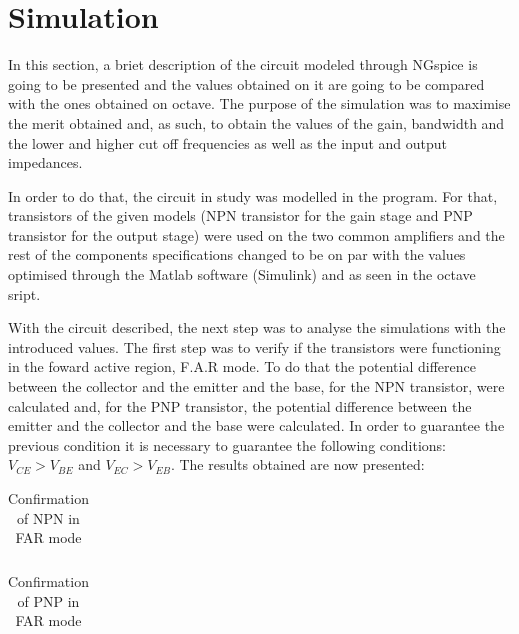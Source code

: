 \section{Simulation}
\label{sec:simulation}

\par In this section, a briet description of the circuit modeled through NGspice is going to be presented and the values obtained on it are going to be compared with the ones obtained on octave. The purpose of the simulation was to maximise the merit obtained and, as such, to obtain the values of the gain, bandwidth and the lower and higher  cut off frequencies as well as the input and output impedances.

\par In order to do that, the circuit in study was modelled in the program. For that, transistors of the given models (NPN transistor for the gain stage and PNP transistor for the output stage) were used on the two common amplifiers and the rest of the components specifications changed to be on par with the values optimised through the Matlab software (Simulink) and as seen in the octave sript.

\par With the circuit described, the next step was to analyse the simulations with the introduced values. The first step was to verify if the transistors were functioning in the foward active region, F.A.R mode. To do that the potential difference between the collector and the emitter and the base, for the NPN transistor, were calculated and, for the PNP transistor, the potential difference between the emitter and the collector and the base were calculated. In order to guarantee the previous condition it is necessary to guarantee the following conditions: $V_{CE}>V_{BE}$ and $V_{EC}>V_{EB}$. The results obtained are now presented:

\begin{table}[H]
  \centering
  \begin{tabular}{|l|r|}
    \hline    
   
     \end{tabular}
  \caption{Confirmation of NPN in FAR mode}
 
\end{table}


\begin{table}[H]
  \centering
  \begin{tabular}{|l|r|}
    \hline    
   
     \end{tabular}
  \caption{Confirmation of PNP in FAR mode}
    
\end{table}

